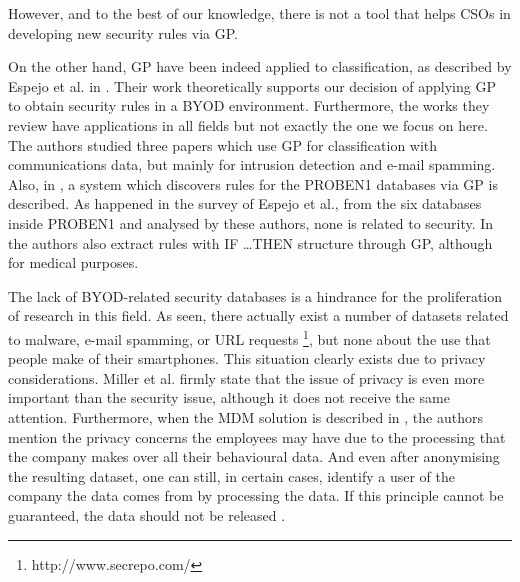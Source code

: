 \documentclass[a4paper,10pt,twocolumn,preprint,3p]{elsarticle}
\begin{document}
However, and to the best of our knowledge, there is not a tool that helps CSOs in developing new security rules via GP.

On the other hand, GP have been indeed applied to classification, as described by Espejo et al. in \cite{espejo2010survey}. Their work theoretically supports our decision of applying GP to obtain security rules in a BYOD environment. Furthermore, the works they review have applications in all fields but not exactly the one we focus on here. The authors studied three papers which use GP for classification with communications data, but mainly for intrusion detection and e-mail spamming. Also, in \cite{DeFalco2002257}, a system which discovers rules for the PROBEN1 databases via GP is described. As happened in the survey of Espejo et al., from the six databases inside PROBEN1 and analysed by these authors, none is related to security. %
In \cite{Tsakonas2004195} the authors also extract rules with \textsc{IF \ldots THEN} structure through GP, although for medical purposes.

The lack of BYOD-related security databases is a hindrance for the proliferation of research in this field. As seen, there actually exist a number of datasets related to malware, e-mail spamming, or URL requests \footnote{http://www.secrepo.com/}, but none about the use that people make of their smartphones. This situation clearly exists due to privacy considerations. Miller et al. \cite{Miller201253} firmly state that the issue of privacy is even more important than the security issue, although it does not receive the same attention. Furthermore, when the MDM solution is described in \cite{ali2015analysis}, the authors mention the privacy concerns the employees may have due to the processing that the company makes over all their behavioural data. And even after anonymising the resulting dataset, one can still, in certain cases, identify a user of the company the data comes from by processing the data. If this principle cannot be guaranteed, the data should not be released \cite{boillat2014handbook}.
\end{document}
